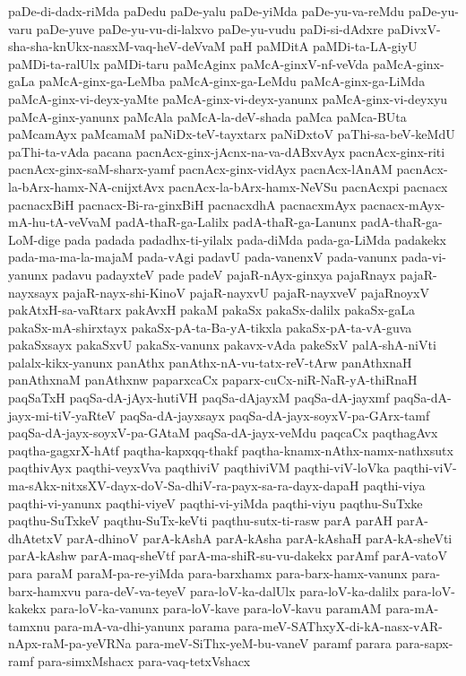 {paDe-di-dadx-riMda
paDedu
paDe-yalu
paDe-yiMda
paDe-yu-va-reMdu
paDe-yu-varu
paDe-yuve
paDe-yu-vu-di-lalxvo
paDe-yu-vudu
paDi-si-dAdxre
paDivxV-sha-sha-knUkx-nasxM-vaq-heV-deVvaM
paH
paMDitA
paMDi-ta-LA-giyU
paMDi-ta-ralUlx
paMDi-taru
paMcAginx
paMcA-ginxV-nf-veVda
paMcA-ginx-gaLa
paMcA-ginx-ga-LeMba
paMcA-ginx-ga-LeMdu
paMcA-ginx-ga-LiMda
paMcA-ginx-vi-deyx-yaMte
paMcA-ginx-vi-deyx-yanunx
paMcA-ginx-vi-deyxyu
paMcA-ginx-yanunx
paMcAla
paMcA-la-deV-shada
paMca
paMca-BUta
paMcamAyx
paMcamaM
paNiDx-teV-tayxtarx
paNiDxtoV
paThi-sa-beV-keMdU
paThi-ta-vAda
pacana
pacnAcx-ginx-jAcnx-na-va-dABxvAyx
pacnAcx-ginx-riti
pacnAcx-ginx-saM-sharx-yamf
pacnAcx-ginx-vidAyx
pacnAcx-lAnAM
pacnAcx-la-bArx-hamx-NA-cnijxtAvx
pacnAcx-la-bArx-hamx-NeVSu
pacnAcxpi
pacnacx
pacnacxBiH
pacnacx-Bi-ra-ginxBiH
pacnacxdhA
pacnacxmAyx
pacnacx-mAyx-mA-hu-tA-veVvaM
padA-thaR-ga-Lalilx
padA-thaR-ga-Lanunx
padA-thaR-ga-LoM-dige
pada
padada
padadhx-ti-yilalx
pada-diMda
pada-ga-LiMda
padakekx
pada-ma-ma-la-majaM
pada-vAgi
padavU
pada-vanenxV
pada-vanunx
pada-vi-yanunx
padavu
padayxteV
pade
padeV
pajaR-nAyx-ginxya
pajaRnayx
pajaR-nayxsayx
pajaR-nayx-shi-KinoV
pajaR-nayxvU
pajaR-nayxveV
pajaRnoyxV
pakAtxH-sa-vaRtarx
pakAvxH
pakaM
pakaSx
pakaSx-dalilx
pakaSx-gaLa
pakaSx-mA-shirxtayx
pakaSx-pA-ta-Ba-yA-tikxla
pakaSx-pA-ta-vA-guva
pakaSxsayx
pakaSxvU
pakaSx-vanunx
pakavx-vAda
pakeSxV
palA-shA-niVti
palalx-kikx-yanunx
panAthx
panAthx-nA-vu-tatx-reV-tArw
panAthxnaH
panAthxnaM
panAthxnw
paparxcaCx
paparx-cuCx-niR-NaR-yA-thiRnaH
paqSaTxH
paqSa-dA-jAyx-hutiVH
paqSa-dAjayxM
paqSa-dA-jayxmf
paqSa-dA-jayx-mi-tiV-yaRteV
paqSa-dA-jayxsayx
paqSa-dA-jayx-soyxV-pa-GArx-tamf
paqSa-dA-jayx-soyxV-pa-GAtaM
paqSa-dA-jayx-veMdu
paqcaCx
paqthagAvx
paqtha-gagxrX-hAtf
paqtha-kapxqq-thakf
paqtha-knamx-nAthx-namx-nathxsutx
paqthivAyx
paqthi-veyxVva
paqthiviV
paqthiviVM
paqthi-viV-loVka
paqthi-viV-ma-sAkx-nitxsXV-dayx-doV-Sa-dhiV-ra-payx-sa-ra-dayx-dapaH
paqthi-viya
paqthi-vi-yanunx
paqthi-viyeV
paqthi-vi-yiMda
paqthi-viyu
paqthu-SuTxke
paqthu-SuTxkeV
paqthu-SuTx-keVti
paqthu-sutx-ti-rasw
parA
parAH
parA-dhAtetxV
parA-dhinoV
parA-kAshA
parA-kAsha
parA-kAshaH
parA-kA-sheVti
parA-kAshw
parA-maq-sheVtf
parA-ma-shiR-su-vu-dakekx
parAmf
parA-vatoV
para
paraM
paraM-pa-re-yiMda
para-barxhamx
para-barx-hamx-vanunx
para-barx-hamxvu
para-deV-va-teyeV
para-loV-ka-dalUlx
para-loV-ka-dalilx
para-loV-kakekx
para-loV-ka-vanunx
para-loV-kave
para-loV-kavu
paramAM
para-mA-tamxnu
para-mA-va-dhi-yanunx
parama
para-meV-SAThxyX-di-kA-nasx-vAR-nApx-raM-pa-yeVRNa
para-meV-SiThx-yeM-bu-vaneV
paramf
parara
para-sapx-ramf
para-simxMshacx
para-vaq-tetxVshacx
}
